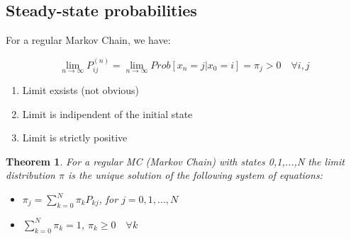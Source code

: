 \documentclass[a4paper,12pt]{report}
\newtheorem{theorem}{Theorem}[section]
\begin{document}
\subsection{Steady-state probabilities}

For a regular Markov Chain, we have:

$$ \lim_{n \to \infty} P_{ij}^{(n)} = \lim_{ n \to \infty} Prob[ x_n=j | x_0 =i] = \pi_j > 0 \quad \forall i, j $$

\begin{enumerate}
\item Limit exsists (not obvious)
\item Limit is indipendent of the initial state
\item Limit is strictly positive
\end{enumerate}


\begin{theorem}
For a regular MC (Markov Chain) with states 0,1,...,N the limit distribution $\pi$ is the unique solution of the following system of equations:

\begin{itemize} %
\item $\pi_j = \sum_{k=0}^N \pi_k P_{k j} $, \qquad for $j = 0,1, ..., N$

\item $\sum_{k=0}^N \pi_k = 1$, \qquad \qquad $\pi_k \ge 0 \quad \forall k$

\end{itemize}
\end{theorem}
\end{document}
